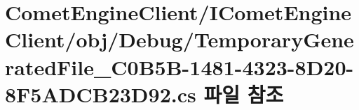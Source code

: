 \hypertarget{_comet_engine_client_2_i_comet_engine_client_2obj_2_debug_2_temporary_generated_file__036_c0_b5_1b21b61018a2eb197fd6190a62437244}{}\section{Comet\+Engine\+Client/\+I\+Comet\+Engine\+Client/obj/\+Debug/\+Temporary\+Generated\+File\+\_\+C0\+B5\+B-\/1481-\/4323-\/8\+D20-\/8\+F5\+A\+D\+C\+B23\+D92.cs 파일 참조}
\label{_comet_engine_client_2_i_comet_engine_client_2obj_2_debug_2_temporary_generated_file__036_c0_b5_1b21b61018a2eb197fd6190a62437244}
